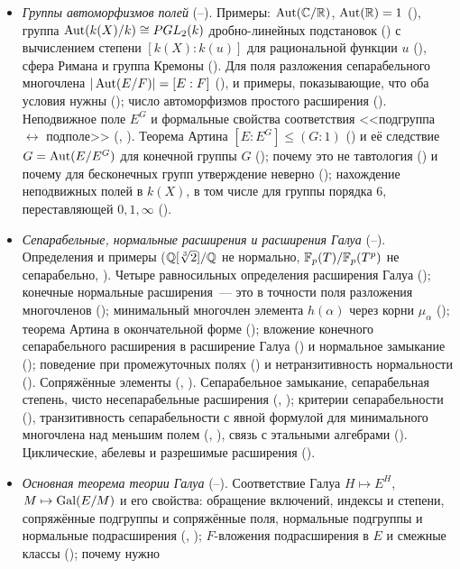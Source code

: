 \begin{itemize}[leftmargin=*]
\item \emph{Группы автоморфизмов полей} (--). Примеры: $\operatorname{Aut}(\mathbb C/\mathbb R)$, $\operatorname{Aut}(\mathbb R)=1$ (), группа
$\operatorname{Aut}(k(X)/k)\cong PGL_2(k)$ дробно-линейных подстановок () с вычислением степени $[k(X):k(u)]$ для рациональной
функции $u$ (), сфера Римана и группа Кремоны (). Для поля разложения сепарабельного многочлена
$|\operatorname{Aut}(E/F)|=[E:F]$ (), и примеры, показывающие, что оба условия нужны (); число автоморфизмов простого расширения (). Неподвижное поле $E^G$ и
формальные свойства соответствия <<подгруппа $\leftrightarrow$ подполе>> (, ). Теорема Артина
$[E:E^G]\le(G:1)$ () и её следствие $G=\operatorname{Aut}(E/E^G)$ для конечной группы $G$ (); почему это не тавтология
() и почему для бесконечных групп утверждение неверно (); нахождение неподвижных полей в $k(X)$, в том
числе для группы порядка $6$, переставляющей $0,1,\infty$ ().
\item \emph{Сепарабельные, нормальные расширения и расширения Галуа} (--). Определения и примеры
($\mathbb Q[\sqrt[3]2]/\mathbb Q$ не нормально, $\mathbb F_p(T)/\mathbb F_p(T^p)$ не сепарабельно, ). Четыре равносильных определения расширения
Галуа (); конечные нормальные расширения~--- это в точности поля разложения многочленов (); минимальный
многочлен элемента $h(\alpha)$ через корни $\mu_\alpha$ (); теорема Артина в окончательной форме (); вложение
конечного сепарабельного расширения в расширение Галуа () и нормальное замыкание (); поведение при
промежуточных полях () и нетранзитивность нормальности (). Сопряжённые элементы (, ).
Сепарабельное замыкание, сепарабельная степень, чисто несепарабельные расширения (, ); критерии
сепарабельности (), транзитивность сепарабельности с явной формулой для минимального многочлена над меньшим
полем (, ), связь с этальными алгебрами (). Циклические, абелевы и разрешимые расширения
().
\item \emph{Основная теорема теории Галуа} (--). Соответствие Галуа $H\mapsto E^H$, $M\mapsto\operatorname{Gal}(E/M)$ и его
свойства: обращение включений, индексы и степени, сопряжённые подгруппы и сопряжённые поля, нормальные подгруппы и
нормальные подрасширения (, ); $F$-вложения подрасширения в $E$ и смежные классы (); почему нужно

\end{itemize}
